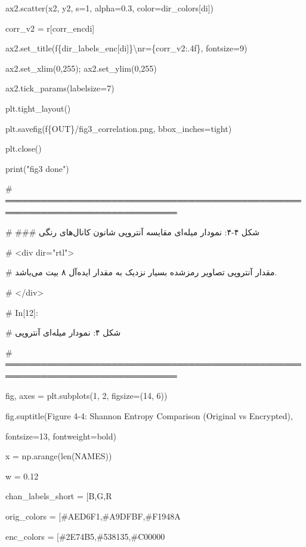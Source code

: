 ax2.scatter(x2, y2, s=1, alpha=0.3, color=dir\_colors{[}di{]})

corr\_v2 = r{[}\textquotesingle corr\_enc\textquotesingle{]}{[}di{]}

ax2.set\_title(f\textquotesingle\{dir\_labels\_enc{[}di{]}\}\textbackslash nr=\{corr\_v2:.4f\}\textquotesingle, fontsize=9)

ax2.set\_xlim(0,255); ax2.set\_ylim(0,255)

ax2.tick\_params(labelsize=7)

plt.tight\_layout()

plt.savefig(f\textquotesingle\{OUT\}/fig3\_correlation.png\textquotesingle, bbox\_inches=\textquotesingle tight\textquotesingle)

plt.close()

print("fig3 done")

\# ═══════════════════════════════════════════════════════════════════════════════

\# \#\#\# شکل ۴-۴: نمودار میله‌ای مقایسه آنتروپی شانون کانال‌های رنگی

\# \textless div dir="rtl"\textgreater{}

\# مقدار آنتروپی تصاویر رمزشده بسیار نزدیک به مقدار ایده‌آل ۸ بیت می‌باشد.

\# \textless/div\textgreater{}

\# In{[}12{]}:

\# شکل ۴: نمودار میله‌ای آنتروپی

\# ═══════════════════════════════════════════════════════════════════════════════

fig, axes = plt.subplots(1, 2, figsize=(14, 6))

fig.suptitle(\textquotesingle Figure 4-4: Shannon Entropy Comparison (Original vs Encrypted)\textquotesingle,

fontsize=13, fontweight=\textquotesingle bold\textquotesingle)

x = np.arange(len(NAMES))

w = 0.12

chan\_labels\_short = {[}\textquotesingle B\textquotesingle,\textquotesingle G\textquotesingle,\textquotesingle R\textquotesingle{]}

orig\_colors = {[}\textquotesingle\#AED6F1\textquotesingle,\textquotesingle\#A9DFBF\textquotesingle,\textquotesingle\#F1948A\textquotesingle{]}

enc\_colors = {[}\textquotesingle\#2E74B5\textquotesingle,\textquotesingle\#538135\textquotesingle,\textquotesingle\#C00000\textquotesingle{]}

